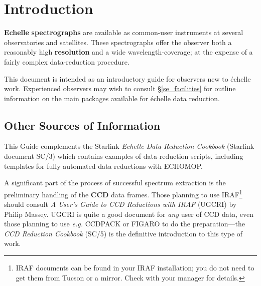 \documentclass[twoside,11pt]{article}
\newcommand{\stardocinitials}  {SG}
\newcommand{\stardocnumber}    {9.2}
\newcommand{\stardocname}{\stardocinitials /\stardocnumber}
\newcommand{\htmladdnormallink}[2]{#1}
\newcommand{\htmlref}[2]{#1}
\newcommand{\xref}[3]{#1}
\newcommand{\xlabel}[1]{}
\newcommand{\sgspec}[2]{#1}
\newcommand{\sgspec}[2]{#2}
\begin{document}
\section{\label{se_introduction}\xlabel{introduction}Introduction}
\markboth{Introduction}{\stardocname}

\htmlref{{\bf Echelle}}{gl_echelle} \htmlref{{\bf
spectrographs}}{gl_spectrograph} are available as
common-user instruments at several observatories and satellites.  These
spectrographs offer the observer both a reasonably high
\htmlref{{\bf resolution}}{gl_resolution} and
a wide wavelength-coverage; at the expense of a fairly complex
data-reduction procedure.

This document is intended as an introductory guide for observers
new to \'{e}chelle work.  Experienced observers may wish to consult
\sgspec{\S \ref{se_facilities} for outline information}
{the \htmlref{outline information}{se_facilities}}
on the main packages available for \'{e}chelle data reduction.


\subsection{\label{se_other_sources}\xlabel{other_sources}Other
            Sources of Information}

This Guide complements the Starlink \xref{{\sl Echelle Data Reduction
Cookbook} (Starlink document SC/3)}{sc3}{} which contains examples of
data-reduction scripts, including templates for fully automated data
reductions with \xref{ECHOMOP}{sun152}{}\@.

A significant part of the process of successful spectrum extraction
is the preliminary handling of the \htmlref{{\bf CCD}}{gl_ccd} data frames.
Those planning to use
\htmladdnormallink{IRAF}
{http://www.starlink.ac.uk/iraf/web/iraf-homepage.html}\sgspec{\footnote{IRAF
documents can be found in your IRAF installation; you
do not need to get them from Tucson or a mirror.  Check with your manager for
details.}}{{\em (All IRAF-related hyperlinks in this document are to the
UK-based Starlink IRAF mirror except \htmladdnormallink{this one}
{http://iraf.noao.edu/} which goes to the Tucson site.)}} should consult
\htmladdnormallink{{\sl A User's Guide to CCD Reductions with IRAF}}
{ftp://starlink-ftp.rl.ac.uk/pub/iraf/iraf/docs/ccduser2.ps.Z} (UGCRI) by Philip Massey.
UGCRI is quite a good document for {\em any} user of CCD data, even those
planning to use {\em e.g.} \xref{CCDPACK}{sun139}{} or
\xref{FIGARO}{sun86}{} to do the preparation\sgspec{---}{ - }the
\xref{{\sl CCD Reduction Cookbook} (SC/5)}{sc5}{} is the definitive
introduction to this type of work.
\end{document}
